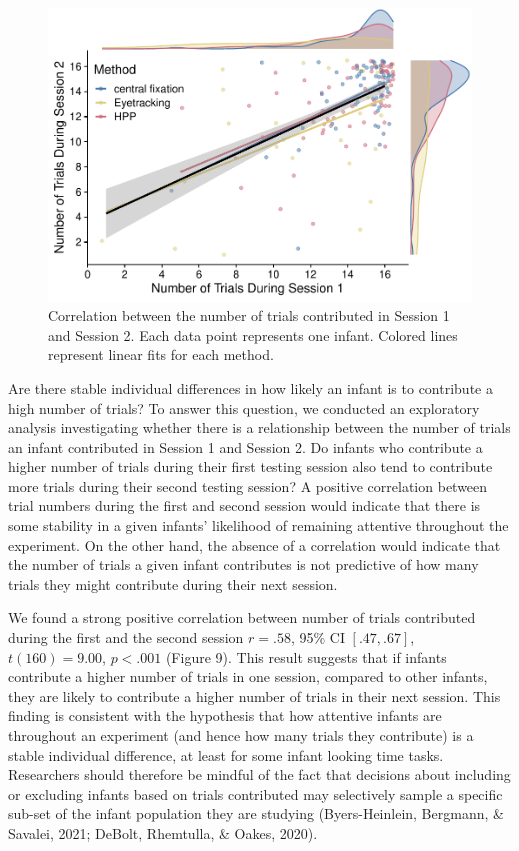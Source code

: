 \documentclass[
  man, donotrepeattitle,floatsintext]{apa6}
\begin{document}
\begin{figure}
\centering
\includegraphics{MB1T_supplement_files/figure-latex/sfig9-1.pdf}
\caption{\label{fig:sfig9}Correlation between the number of trials contributed in Session 1 and Session 2. Each data point represents one infant. Colored lines represent linear fits for each method.}
\end{figure}

Are there stable individual differences in how likely an infant is to contribute a high number of trials?
To answer this question, we conducted an exploratory analysis investigating whether there is a relationship between the number of trials an infant contributed in Session 1 and Session 2.
Do infants who contribute a higher number of trials during their first testing session also tend to contribute more trials during their second testing session?
A positive correlation between trial numbers during the first and second session would indicate that there is some stability in a given infants' likelihood of remaining attentive throughout the experiment.
On the other hand, the absence of a correlation would indicate that the number of trials a given infant contributes is not predictive of how many trials they might contribute during their next session.

We found a strong positive correlation between number of trials contributed during the first and the second session \(r = .58\), 95\% CI \([.47, .67]\), \(t(160) = 9.00\), \(p < .001\) (Figure 9).
This result suggests that if infants contribute a higher number of trials in one session, compared to other infants, they are likely to contribute a higher number of trials in their next session.
This finding is consistent with the hypothesis that how attentive infants are throughout an experiment (and hence how many trials they contribute) is a stable individual difference, at least for some infant looking time tasks.
Researchers should therefore be mindful of the fact that decisions about including or excluding infants based on trials contributed may selectively sample a specific sub-set of the infant population they are studying (Byers-Heinlein, Bergmann, \& Savalei, 2021; DeBolt, Rhemtulla, \& Oakes, 2020).
\end{document}
